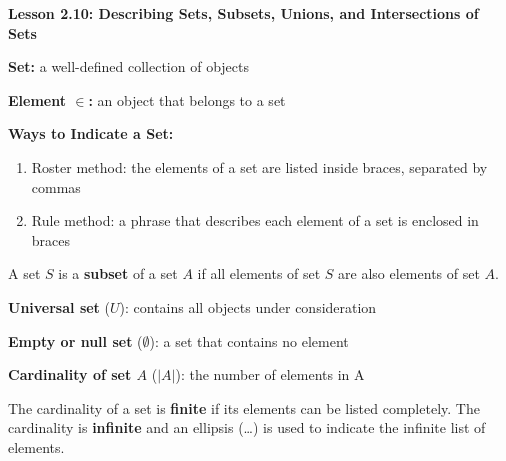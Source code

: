 \begin{center}
\textbf{Lesson 2.10: Describing Sets, Subsets, Unions, and Intersections of Sets}
\end{center}

\vspace*{-1.5ex}

\noindent\textbf{Set:} a well-defined collection of objects

\noindent\textbf{Element \(\in\):} an object that belongs to a set

\noindent\textbf{Ways to Indicate a Set:}
\begin{enumerate}[noitemsep, label = \color{blue}\arabic*. ]
\item Roster method: the elements of a set are listed inside braces, separated by commas
\item Rule method: a phrase that describes each element of a set is enclosed in braces
\end{enumerate}


\noindent A set \(S\) is a \textbf{subset} of a set \(A\) if all elements of set \(S\) are also elements of set \(A\).

\noindent\textbf{Universal set} (\(U\)): contains all objects under consideration

\noindent\textbf{Empty or null set} (\(\emptyset\)): a set that contains no element

\noindent\textbf{Cardinality of set \(A\)} (\(|A|\)): the number of elements in A

The cardinality of a set is \textbf{finite} if its elements can be listed completely.
The cardinality is \textbf{infinite} and an ellipsis (\ldots) is used to indicate the infinite list of elements. 


